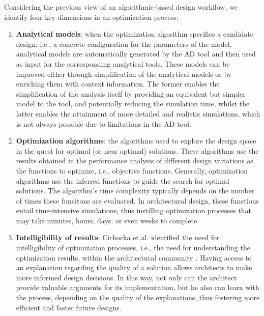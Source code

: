 Considering the previous view of an algorithmic-based design workflow, we identify four key dimensions in an optimization process:

\begin{enumerate}
\item \textbf{Analytical models}: when the optimization algorithm specifies a candidate design, i.e., a concrete configuration for the parameters of the model, analytical models are automatically generated by the \ac{AD} tool and then used as input for the corresponding analytical tools. These models can be improved either through simplification of the analytical models or by enriching them with context information. The former enables the simplification of the analysis itself by providing an equivalent but simpler model to the tool, and potentially reducing the simulation time, whilst the latter enables the attainment of more detailed and realistic simulations, which is not always possible due to limitations in the \ac{AD} tool. 

\item \textbf{Optimization algorithms}: the algorithms used to explore the design space in the quest for optimal (or near optimal) solutions. These algorithms use the results obtained in the performance analysis of different design variations as the functions to optimize, i.e., objective functions. Generally, optimization algorithms use the inferred functions to guide the search for optimal solutions. The algorithm's time complexity typically depends on the number of times these funcitons are evaluated. In architectural design, these functions entail time-intensive simulations, thus instilling optimization processes that may take minutes, hours, days, or even weeks to complete.

\item \textbf{Intelligibility of results}: Cichocka et al. identified the need for intelligibility of optimization processes, i.e., the need for understanding the optimization results, within the architectural community \cite{Cichocka2017SURVEY}. Having access to an explanation regarding the quality of a solution allows architects to make more informed design decisions. In this way, not only can the architect provide valuable arguments for its implementation, but he also can learn with the process, depending on the quality of the explanations, thus fostering more efficient and faster future designs. 


\end{enumerate}
